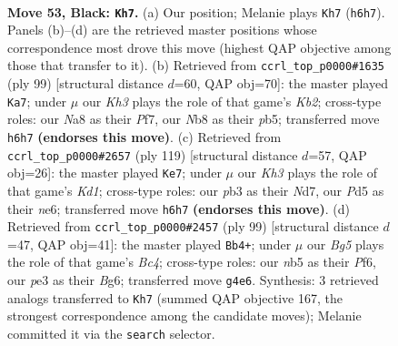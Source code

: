 \documentclass[11pt]{article}
\begin{document}
\clearpage

\begin{figure}[p]\centering
\begin{subfigure}{0.46\textwidth}\centering
\resizebox{\linewidth}{!}{%
\newchessgame
\chessboard[
  setfen={nn6/1p6/1b3B1k/pN1p4/6bp/PP2P3/4P1K1/3B4 b - - 3 53},
  showmover=false,
  pgfstyle=straightmove, color=movearrow, markmove={h6-h7}
]}
\caption{}
\end{subfigure}\hfill
\begin{subfigure}{0.46\textwidth}\centering
\resizebox{\linewidth}{!}{%
\newchessgame
\chessboard[
  setfen={8/1k3p2/5b2/1P1p1p2/3P1p2/K1B2P1r/1P6/5R2 b - - 4 50},
  showmover=false,
  pgfstyle=straightmove, color=movearrow, markmove={b7-a7}
]}
\caption{}
\end{subfigure}
\\[4pt]
\begin{subfigure}{0.46\textwidth}\centering
\resizebox{\linewidth}{!}{%
\newchessgame
\chessboard[
  setfen={3k4/3n4/2p1Npb1/6pp/1K1PP3/6P1/2B3P1/8 b - - 28 60},
  showmover=false,
  pgfstyle=straightmove, color=movearrow, markmove={d8-e7}
]}
\caption{}
\end{subfigure}\hfill
\begin{subfigure}{0.46\textwidth}\centering
\resizebox{\linewidth}{!}{%
\newchessgame
\chessboard[
  setfen={8/1p2k3/2p2pb1/p1b5/P4P2/1B2PP2/1P1K1N2/8 b - - 42 50},
  showmover=false,
  pgfstyle=straightmove, color=movearrow, markmove={c5-b4}
]}
\caption{}
\end{subfigure}
\caption{\textbf{Move 53, Black: \texttt{Kh7}.} (a) Our position; Melanie plays \texttt{Kh7} (\texttt{h6h7}). Panels (b)--(d) are the retrieved master positions whose correspondence most drove this move (highest QAP objective among those that transfer to it). (b) Retrieved from \texttt{ccrl\_top\_p0000\#1635} (ply 99) [structural distance $d$=60, QAP obj=70]: the master played \texttt{Ka7}; under $\mu$ our \emph{Kh3} plays the role of that game's \emph{Kb2}; cross-type roles: our \emph{N}a8 as their \emph{P}f7, our \emph{N}b8 as their \emph{p}b5; transferred move \texttt{h6h7} \textbf{(endorses this move)}. (c) Retrieved from \texttt{ccrl\_top\_p0000\#2657} (ply 119) [structural distance $d$=57, QAP obj=26]: the master played \texttt{Ke7}; under $\mu$ our \emph{Kh3} plays the role of that game's \emph{Kd1}; cross-type roles: our \emph{p}b3 as their \emph{N}d7, our \emph{P}d5 as their \emph{n}e6; transferred move \texttt{h6h7} \textbf{(endorses this move)}. (d) Retrieved from \texttt{ccrl\_top\_p0000\#2457} (ply 99) [structural distance $d$=47, QAP obj=41]: the master played \texttt{Bb4+}; under $\mu$ our \emph{Bg5} plays the role of that game's \emph{Bc4}; cross-type roles: our \emph{n}b5 as their \emph{P}f6, our \emph{p}e3 as their \emph{B}g6; transferred move \texttt{g4e6}. Synthesis: 3 retrieved analogs transferred to \texttt{Kh7} (summed QAP objective 167, the strongest correspondence among the candidate moves); Melanie committed it via the \texttt{search} selector.}
\label{fig:thought-m105}
\end{figure}
\end{document}
